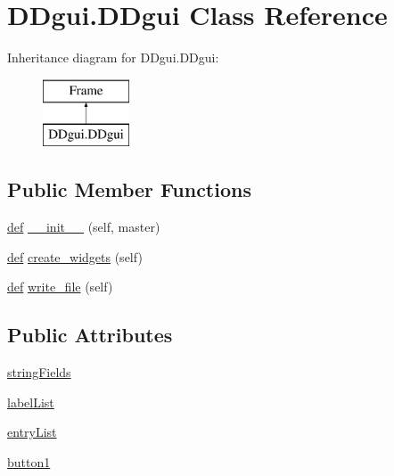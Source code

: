 \hypertarget{class_d_dgui_1_1_d_dgui}{}\section{D\+Dgui.\+D\+Dgui Class Reference}
\label{class_d_dgui_1_1_d_dgui}
Inheritance diagram for D\+Dgui.\+D\+Dgui\+:\begin{figure}[H]
\begin{center}
\leavevmode
\includegraphics[height=2.000000cm]{class_d_dgui_1_1_d_dgui}
\end{center}
\end{figure}
\subsection*{Public Member Functions}
\begin{DoxyCompactItemize}
\item 
\hyperlink{_f_e_m_2linear__elasticity__3d_2plot_solution_8m_a77bd7ea3b0a76184dde27211c641f70d}{def} \hyperlink{class_d_dgui_1_1_d_dgui_aaf493d5f3aa19c51f2f6d35bf07c0e39}{\+\_\+\+\_\+init\+\_\+\+\_\+} (self, master)
\item 
\hyperlink{_f_e_m_2linear__elasticity__3d_2plot_solution_8m_a77bd7ea3b0a76184dde27211c641f70d}{def} \hyperlink{class_d_dgui_1_1_d_dgui_a5bff3d03e10a39395fc4eb2fb64b0d43}{create\+\_\+widgets} (self)
\item 
\hyperlink{_f_e_m_2linear__elasticity__3d_2plot_solution_8m_a77bd7ea3b0a76184dde27211c641f70d}{def} \hyperlink{class_d_dgui_1_1_d_dgui_a8dae2163b5cad44a8d443174abec25da}{write\+\_\+file} (self)
\end{DoxyCompactItemize}
\subsection*{Public Attributes}
\begin{DoxyCompactItemize}
\item 
\hyperlink{class_d_dgui_1_1_d_dgui_a1a59216313e5a1e12e2b43cfc0a478e0}{string\+Fields}
\item 
\hyperlink{class_d_dgui_1_1_d_dgui_aebd2ffde85b31b66c5c3f8f9402bcbaf}{label\+List}
\item 
\hyperlink{class_d_dgui_1_1_d_dgui_a85b5119c605b679d6b0e04c395aa8e26}{entry\+List}
\item 
\hyperlink{class_d_dgui_1_1_d_dgui_a9b6927379e1ad439ff06cd2e99bd2c17}{button1}
\end{DoxyCompactItemize}


